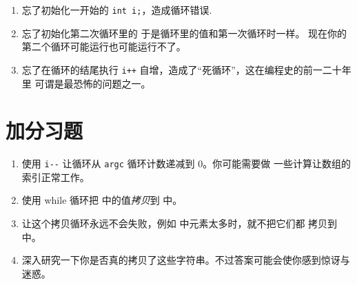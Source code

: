 \begin{enumerate}
\item 忘了初始化一开始的 \verb|int i;|，造成循环错误.
\item 忘了初始化第二次循环里的  于是循环里的值和第一次循环时一样。
现在你的第二个循环可能运行也可能运行不了。
\item 忘了在循环的结尾执行 \verb|i++| 自增，造成了“死循环”，这在编程史的前一二十年里
可谓是最恐怖的问题之一。
\end{enumerate}

\section{加分习题}

\begin{enumerate}
\item 使用 \verb|i--| 让循环从 \verb|argc| 循环计数递减到 0。你可能需要做
一些计算让数组的索引正常工作。
\item 使用 while 循环把  中的值\emph{拷贝}到  中。
\item 让这个拷贝循环永远不会失败，例如  中元素太多时，就不把它们都
拷贝到  中。
\item 深入研究一下你是否真的拷贝了这些字符串。不过答案可能会使你感到惊讶与迷惑。
\end{enumerate}


